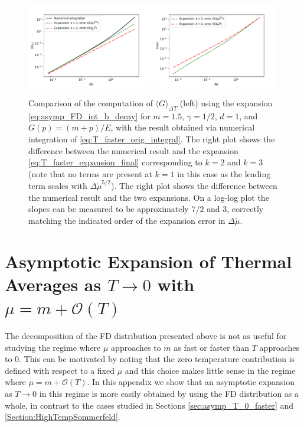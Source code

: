 \documentclass[sn-mathphys,Numbered]{sn-jnl}
\begin{document}
\begin{figure}
\centering
\includegraphics[width=0.49\textwidth]{./plot/FD_avg_expansion_comparison_T_decay_faster.pdf}
\includegraphics[width=0.49\textwidth]{./plot/FD_avg_expansion_error_comparison_T_decay_faster.pdf}
\caption{Comparison of the computation of $\langle G\rangle_{\Delta T}$   (left) using the expansion \eqref{eq:asymp_FD_int_b_decay} for $m=1.5$, $\gamma=1/2$, $d=1$, and $G(p)=(m+p)/E$, with the result obtained via numerical integration of \eqref{eq:T_faster_orig_integral}. The right plot shows the difference between the numerical result and the expansion \eqref{eq:T_faster_expansion_final} corresponding to $k=2$ and $k=3$ (note that no terms are present at $k=1$ in this case as the leading term scales with $\Delta\widetilde{\mu}^{5/2}$).  The right plot shows the difference between the numerical result and the two expansions.  On a log-log plot  the slopes can be measured to be approximately $7/2$ and $3$, correctly matching the indicated order of the expansion error in $\Delta\widetilde{\mu}$. }\label{fig:T_faster_expansion_comparison}
\end{figure}


\section{Asymptotic Expansion of Thermal Averages as $T\to 0$ with $\mu=m+\mathcal{O}(T)$}\label{sec:asympt_Delta_mu_order_T}
The decomposition of the FD distribution presented above is not as useful for studying the regime where $\mu$ approaches to $m$ as fast or faster than $T$ approaches to $0$.  This can be motivated by noting that the zero temperature contribution  is defined with respect to a fixed $\mu$ and this choice makes little sense  in the regime where $\mu=m+\mathcal{O}(T)$.  In this appendix we show that an asymptotic expansion as $T\to 0$ in this regime is more easily obtained by using the FD distribution as a whole, in contrast to the cases studied in Sections  \ref{sec:asymp_T_0_faster} and \ref{Section:HighTempSommerfeld}.
\end{document}
